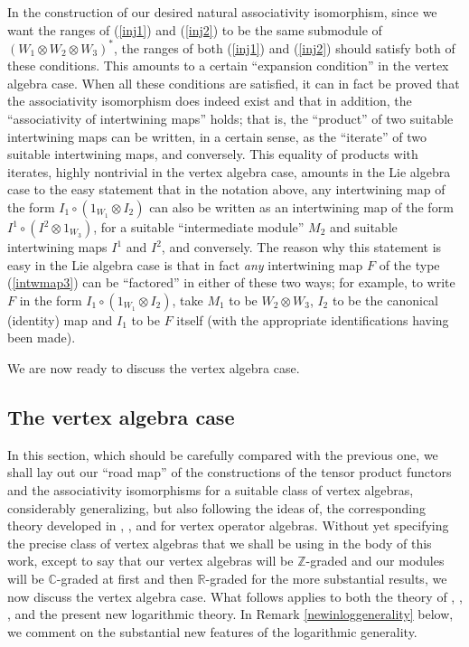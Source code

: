 \documentclass[12pt]{article}
\begin{document}
In the construction of our desired natural associativity isomorphism,
since we want the ranges of (\ref{inj1}) and (\ref{inj2}) to be the
same submodule of $(W_1\otimes W_2\otimes W_3)^*$, the ranges of both
(\ref{inj1}) and (\ref{inj2}) should satisfy both of these conditions.
This amounts to a certain ``expansion condition'' in the vertex
algebra case.  When all these conditions are satisfied, it can in fact
be proved \cite{tensor4} that the associativity isomorphism does
indeed exist and that in addition, the ``associativity of intertwining
maps'' holds; that is, the ``product'' of two suitable intertwining
maps can be written, in a certain sense, as the ``iterate'' of two
suitable intertwining maps, and conversely.  This equality of products
with iterates, highly nontrivial in the vertex algebra case, amounts
in the Lie algebra case to the easy statement that in the notation
above, any intertwining map of the form $I_1\circ (1_{W_1}\otimes
I_2)$ can also be written as an intertwining map of the form $I^1\circ
(I^2\otimes 1_{W_3})$, for a suitable ``intermediate module'' $M_2$
and suitable intertwining maps $I^1$ and $I^2$, and conversely.  The
reason why this statement is easy in the Lie algebra case is that in
fact {\it any} intertwining map $F$ of the type (\ref{intwmap3}) can
be ``factored'' in either of these two ways; for example, to write $F$
in the form $I_1\circ (1_{W_1}\otimes I_2)$, take $M_1$ to be
$W_2\otimes W_3$, $I_2$ to be the canonical (identity) map and $I_1$
to be $F$ itself (with the appropriate identifications having been
made).

We are now ready to discuss the vertex algebra case.

\subsection{The vertex algebra case}

In this section, which should be carefully compared with the
previous one, we shall lay out our ``road map'' of the constructions
of the tensor product functors and the associativity isomorphisms for
a suitable class of vertex algebras, considerably generalizing, but
also following the ideas of, the corresponding theory developed in
\cite{tensor1}, \cite{tensor2}, \cite{tensor3} and \cite{tensor4} for
vertex operator algebras.  Without yet specifying the precise class of
vertex algebras that we shall be using in the body of this work,
except to say that our vertex algebras will be $\mathbb{Z}$-graded and
our modules will be $\mathbb{C}$-graded at first and then
$\mathbb{R}$-graded for the more substantial results, we now discuss
the vertex algebra case.  What follows applies to both the theory of
\cite{tensor1}, \cite{tensor2}, \cite{tensor3}, \cite{tensor4} and the
present new logarithmic theory.  In Remark \ref{newinloggenerality}
below, we comment on the substantial new features of the logarithmic
generality.
\end{document}
